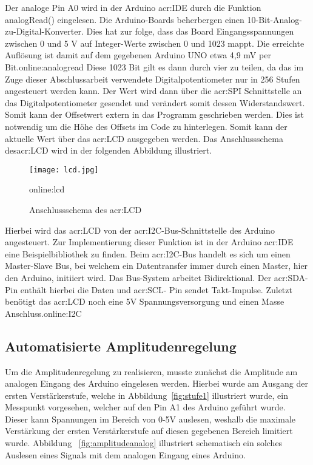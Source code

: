Der analoge Pin A0 wird in der Arduino \gls{acr:IDE} durch die Funktion analogRead() eingelesen. Die Arduino-Boards beherbergen einen 10-Bit-Analog-zu-Digital-Konverter. Dies hat zur folge, dass das Board Eingangsspannungen zwischen 0 und 5 V auf Integer-Werte zwischen 0 und 1023 mappt. Die erreichte Auflösung ist damit auf dem gegebenen Arduino UNO etwa 4,9 mV per Bit.\gls{online:analogread} Diese 1023 Bit gilt es dann durch vier zu teilen, da das im Zuge dieser Abschlussarbeit verwendete Digitalpotentiometer nur in 256 Stufen angesteuert werden kann. Der Wert wird dann über die \gls{acr:SPI} Schnittstelle an das Digitalpotentiometer gesendet und verändert somit dessen Widerstandswert. Somit kann der Offsetwert extern in das Programm geschrieben werden. Dies ist notwendig um die Höhe des Offsets im Code zu hinterlegen. Somit kann der aktuelle Wert über das \gls{acr:LCD} ausgegeben werden. Das Anschlussschema des\gls{acr:LCD} wird in der folgenden Abbildung illustriert.

\begin{figure}[H]
	\centering
	\texttt{[image: lcd.jpg]}
	\caption[Anschlussschema des \gls{acr:LCD}]{Anschlussschema des \gls{acr:LCD}} 
	\gls{online:lcd}
	\label{fig:lcd}
\end{figure}

Hierbei wird das \gls{acr:LCD} von der \gls{acr:I2C}-Bus-Schnittstelle des Arduino angesteuert. Zur Implementierung dieser Funktion ist in der Arduino \gls{acr:IDE} eine Beispielbibliothek zu finden. Beim \gls{acr:I2C}-Bus handelt es sich um einen Master-Slave Bus, bei welchem ein Datentransfer immer durch einen Master, hier den Arduino, initiiert wird. Das Bus-System arbeitet Bidirektional. Der \gls{acr:SDA}-Pin enthält hierbei die Daten und \gls{acr:SCL}- Pin sendet Takt-Impulse. Zuletzt benötigt das \gls{acr:LCD} noch eine 5V Spannungsversorgung und einen Masse Anschluss.\gls{online:I2C}
\newpage
\subsection{Automatisierte Amplitudenregelung}
\label{subsec:autoamp}

Um die Amplitudenregelung zu realisieren, musste zunächst die Amplitude am analogen Eingang des Arduino eingelesen werden. Hierbei wurde am Ausgang der ersten Verstärkerstufe, welche in Abbildung~\ref{fig:stufe1} illustriert wurde, ein Messpunkt vorgesehen, welcher auf den Pin A1 des Arduino geführt wurde. Dieser kann Spannungen im Bereich von 0-5V auslesen, weshalb die maximale Verstärkung der ersten Verstärkerstufe auf diesen gegebenen Bereich limitiert wurde. Abbildung ~\ref{fig:amplitudeanalog} illustriert schematisch ein solches Auslesen eines Signals mit dem analogen Eingang eines Arduino. 

